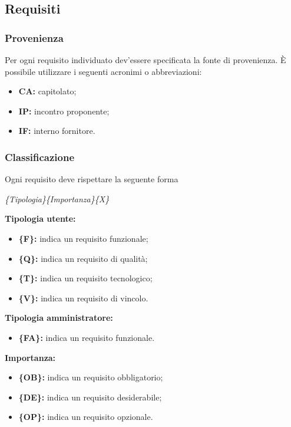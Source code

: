 {\subsection{Requisiti} {
\subsubsection{Provenienza}{
Per ogni requisito individuato dev'essere specificata la fonte di provenienza.
\`E possibile utilizzare i seguenti acronimi o abbreviazioni:
\begin{itemize}
	\item []\textbf{CA:} capitolato;
	\item []\textbf{IP:} incontro proponente;
	\item []\textbf{IF:} interno fornitore.
\end{itemize}
}%

\subsubsection{Classificazione}{
Ogni requisito deve rispettare la seguente forma 
		\begin{center}
			\textit{\{Tipologia\}\{Importanza\}\{X\}} 
		\end{center}
		
		\textbf{Tipologia utente:}
		\begin{itemize}
			\item []\textbf {\{F\}:} indica un requisito funzionale;
			\item []\textbf {\{Q\}:} indica un requisito di qualità;
			\item []\textbf {\{T\}:} indica un requisito tecnologico;
			\item []\textbf {\{V\}:} indica un requisito di vincolo.
		\end{itemize}
		
		\textbf{Tipologia amministratore:}
		\begin{itemize}
			\item []\textbf {\{FA\}:} indica un requisito funzionale.
		\end{itemize}
		
		\textbf{Importanza:}	
		\begin{itemize}
			\item []\textbf{\{OB\}:} indica un requisito obbligatorio; 
			\item []\textbf{\{DE\}:} indica un requisito desiderabile;
			\item []\textbf{\{OP\}:} indica un requisito opzionale.
		\end{itemize}
		
}}}

